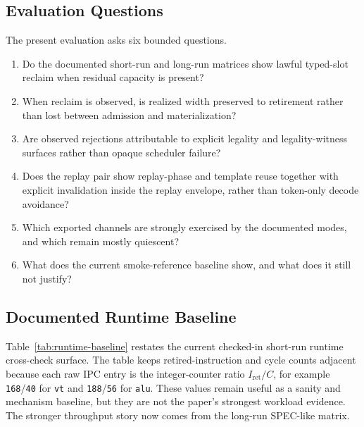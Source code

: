 \documentclass[twocolumn]{article}
\begin{document}
\subsection{Evaluation Questions}

The present evaluation asks six bounded questions.

\begin{enumerate}
\item Do the documented short-run and long-run matrices show lawful typed-slot reclaim when residual capacity is present?
\item When reclaim is observed, is realized width preserved to retirement rather than lost between admission and materialization?
\item Are observed rejections attributable to explicit legality and legality-witness surfaces rather than opaque scheduler failure?
\item Does the replay pair show replay-phase and template reuse together with explicit invalidation inside the replay envelope, rather than token-only decode avoidance?
\item Which exported channels are strongly exercised by the documented modes, and which remain mostly quiescent?
\item What does the current smoke-reference baseline show, and what does it still not justify?
\end{enumerate}


\subsection{Documented Runtime Baseline}

Table~\ref{tab:runtime-baseline} restates the current checked-in short-run runtime cross-check surface. The table keeps retired-instruction and cycle counts adjacent because each raw IPC entry is the integer-counter ratio \(I_{\mathrm{ret}}/C\), for example \texttt{168}/\texttt{40} for \texttt{vt} and \texttt{188}/\texttt{56} for \texttt{alu}. These values remain useful as a sanity and mechanism baseline, but they are not the paper's strongest workload evidence. The stronger throughput story now comes from the long-run SPEC-like matrix.


\end{document}
